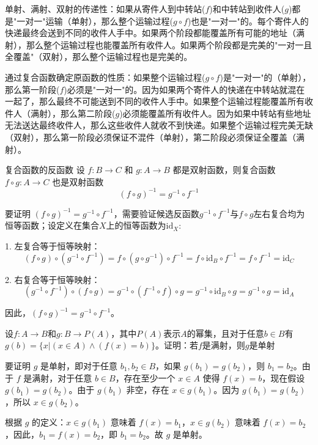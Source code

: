 \documentclass[lang=cn,11pt]{elegantbook}
\begin{document}
单射、满射、双射的传递性：如果从寄件人到中转站($f$)和中转站到收件人($g$)都是"一对一"运输（单射），那么整个运输过程($g \circ f$)也是"一对一"的。每个寄件人的快递最终会送到不同的收件人手中。如果两个阶段都能覆盖所有可能的地址（满射），那么整个运输过程也能覆盖所有收件人。如果两个阶段都是完美的"一对一且全覆盖"（双射），那么整个运输过程也是完美的。

通过复合函数确定原函数的性质：如果整个运输过程($g \circ f$)是"一对一"的（单射），那么第一阶段($f$)必须是"一对一"的。因为如果两个寄件人的快递在中转站就混在一起了，那么最终不可能送到不同的收件人手中。如果整个运输过程能覆盖所有收件人（满射），那么第二阶段($g$)必须能覆盖所有收件人。因为如果中转站有些地址无法送达最终收件人，那么这些收件人就收不到快递。如果整个运输过程完美无缺（双射），那么第一阶段必须保证不混件（单射），第二阶段必须保证全覆盖（满射）。
\begin{theorem}{复合函数的反函数}
设 $f: B \to C$ 和 $g: A \to B$ 都是双射函数，则复合函数 $f \circ g: A \to C$ 也是双射函数\vspace{-10pt}
\[(f \circ g)^{-1} = g^{-1} \circ f^{-1}\]
\end{theorem}
要证明 $(f \circ g)^{-1} = g^{-1} \circ f^{-1}$，需要验证候选反函数$g^{-1}\circ f^{-1}$与$f\circ g$左右复合均为恒等函数；设定义在集合$X$上的恒等函数为$\text{id}_X$:

1. 左复合等于恒等映射：
\[
(f \circ g) \circ (g^{-1} \circ f^{-1}) = f \circ (g \circ g^{-1}) \circ f^{-1} = f \circ \text{id}_B \circ f^{-1} = f \circ f^{-1} = \text{id}_C
\]

2. 右复合等于恒等映射：
\[
(g^{-1} \circ f^{-1}) \circ (f \circ g) = g^{-1} \circ (f^{-1} \circ f) \circ g = g^{-1} \circ \text{id}_B \circ g = g^{-1} \circ g = \text{id}_A
\]

因此，$(f \circ g)^{-1} = g^{-1} \circ f^{-1}$。
\begin{example}
    设$f:A\to B$和$g:B\to P(A)$，其中$P(A)$表示$A$的幂集，且对于任意$b\in B$有$g(b)=\{x|(x\in A)\land(f(x)=b)\}$。证明：若$f$是满射，则$g$是单射
\end{example}
要证明 $g$ 是单射，即对于任意 $b_1, b_2 \in B$，如果 $g(b_1) = g(b_2)$，则 $b_1 = b_2$。由于 $f$ 是满射，对于任意 $b \in B$，存在至少一个 $x \in A$ 使得 $f(x) = b$，现在假设 $g(b_1) = g(b_2)$。由于 $g(b_1)$ 非空，存在 $x \in g(b_1)$。因为 $g(b_1) = g(b_2)$，所以 $x \in g(b_2)$。

根据 $g$ 的定义：$x \in g(b_1)$ 意味着 $f(x) = b_1$，$x \in g(b_2)$ 意味着 $f(x) = b_2$，因此，$b_1 = f(x) = b_2$，即 $b_1 = b_2$。故 $g$ 是单射。
\end{document}
